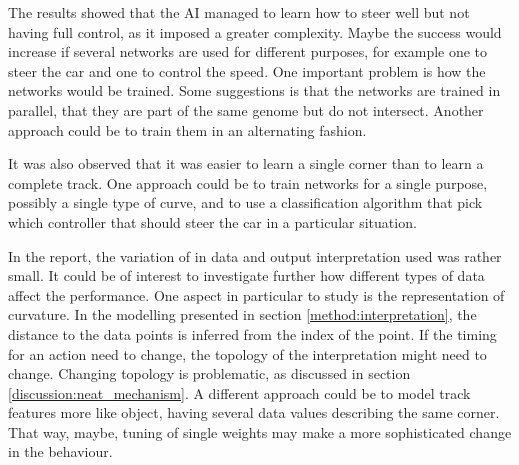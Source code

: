 The results showed that the AI managed to learn how to steer well but not having full control, as it imposed a greater complexity. Maybe the success would increase if several networks are used for different purposes, for example one to steer the car and one to control the speed. One important problem is how the networks would be trained. Some suggestions is that the networks are trained in parallel, that they are part of the same genome but do not intersect. Another approach could be to train them in an alternating fashion.

It was also observed that it was easier to learn a single corner than to learn a complete track. One approach could be to train networks for a single purpose, possibly a single type of curve, and to use a classification algorithm that pick which controller that should steer the car in a particular situation.

In the report, the variation of in data and output interpretation used was rather small. It could be of interest to investigate further how different types of data affect the performance. One aspect in particular to study is the representation of curvature. In the modelling presented in section \ref{method:interpretation}, the distance to the data points is inferred from the index of the point. If the timing for an action need to change, the topology of the interpretation might need to change. Changing topology is problematic, as discussed in section \ref{discussion:neat_mechanism}. A different approach could be to model track features more like object, having several data values describing the same corner. That way, maybe, tuning of single weights may make a more sophisticated change in the behaviour.










